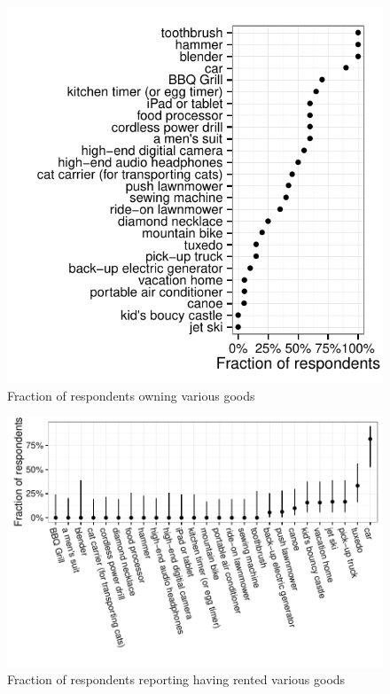 \documentclass[11pt]{article}
\begin{document}
\begin{figure}
\centering 
\caption{Fraction of respondents owning various goods \label{fig:frac_owning} }
\begin{minipage}{0.90 \linewidth}
\includegraphics[width = \linewidth]{./plots/ownership_fractions.pdf} 
\end{minipage} 
\end{figure} 

\begin{figure}
\centering 
\caption{Fraction of respondents reporting having rented various goods \label{fig:frac_renting}}
\begin{minipage}{0.90 \linewidth}
\includegraphics[width = \linewidth]{./plots/rental_fractions.pdf} 
\end{minipage} 
\end{figure} 
\end{document}
